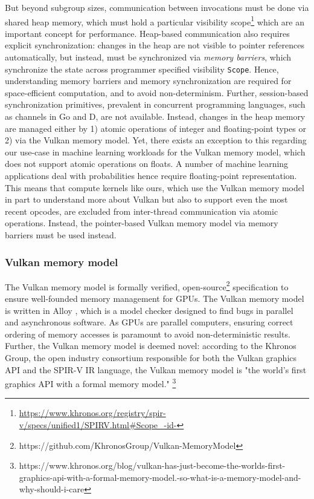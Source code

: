 \documentclass{IEEEtran}
\begin{document}
But beyond subgroup sizes, communication between invocations must be done via shared heap memory, which must hold a particular visibility scope\footnote{\url{https://www.khronos.org/registry/spir-v/specs/unified1/SPIRV.html#Scope_-id-}} which are an important concept for performance. Heap-based communication also requires explicit synchronization: changes in the heap are not visible to pointer references automatically, but instead, must be synchronized via \textit{memory barriers}, which synchronize the state across programmer specified visibility \verb|Scope|. Hence, understanding memory barriers and memory synchronization are required for space-efficient computation, and to avoid non-determinism. Further, session-based synchronization primitives, prevalent in concurrent programming languages, such as channels in Go and D, are not available. Instead, changes in the heap memory are managed either by 1) atomic operations of integer and floating-point types or 2) via the Vulkan memory model. Yet, there exists an exception to this regarding our use-case in machine learning workloads for the Vulkan memory model, which does not support atomic operations on floats. A number of machine learning applications deal with probabilities hence require floating-point representation. This means that compute kernels like ours, which use the Vulkan memory model in part to understand more about Vulkan but also to support even the most recent opcodes, are excluded from inter-thread communication via atomic operations. Instead, the pointer-based Vulkan memory model via memory barriers must be used instead.

\subsubsection{Vulkan memory model}
\label{ch:vmm}

The Vulkan memory model is formally verified, open-source\footnote{https://github.com/KhronosGroup/Vulkan-MemoryModel} specification to ensure well-founded memory management for GPUs. The Vulkan memory model is written in Alloy \cite{10.1145/3338843}, which is a model checker designed to find bugs in parallel and asynchronous software. As GPUs are parallel computers, ensuring correct ordering of memory accesses is paramount to avoid non-deterministic results. Further, the Vulkan memory model is deemed novel: according to the Khronos Group, the open industry consortium responsible for both the Vulkan graphics API and the SPIR-V IR language, the Vulkan memory model is "the world's first graphics API with a formal memory model." \footnote{https://www.khronos.org/blog/vulkan-has-just-become-the-worlds-first-graphics-api-with-a-formal-memory-model.-so-what-is-a-memory-model-and-why-should-i-care}
\end{document}

